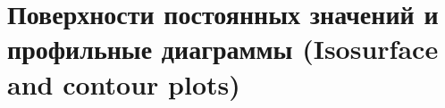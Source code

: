 \begin{figure}[ht]
\end{figure}

\section{Поверхности постоянных значений и профильные диаграммы (Isosurface and contour plots)}
\label{sec:2.1.4.1}
